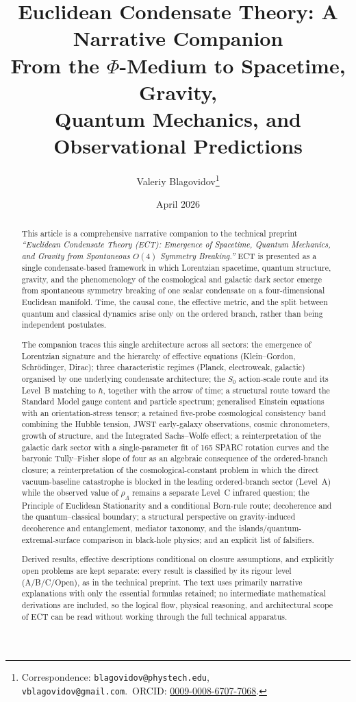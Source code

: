 \documentclass[11pt,a4paper]{article}
\title{\textbf{Euclidean Condensate Theory: A Narrative Companion}\\[6pt]
\large From the $\Phi$-Medium to Spacetime, Gravity,\\
Quantum Mechanics, and Observational Predictions}
\author{Valeriy Blagovidov\thanks{Correspondence: \texttt{blagovidov@phystech.edu}, \texttt{vblagovidov@gmail.com}.~ORCID: \href{https://orcid.org/0009-0008-6707-7068}{0009-0008-6707-7068}.}}
\date{April 2026}
\begin{document}
\maketitle

\begin{abstract}
This article is a comprehensive narrative companion to the technical preprint \emph{``Euclidean Condensate Theory (ECT): Emergence of Spacetime, Quantum Mechanics, and Gravity from Spontaneous $O(4)$ Symmetry Breaking.''} ECT is presented as a single condensate-based framework in which Lorentzian spacetime, quantum structure, gravity, and the phenomenology of the cosmological and galactic dark sector emerge from spontaneous symmetry breaking of one scalar condensate on a four-dimensional Euclidean manifold. Time, the causal cone, the effective metric, and the split between quantum and classical dynamics arise only on the ordered branch, rather than being independent postulates.

The companion traces this single architecture across all sectors: the emergence of Lorentzian signature and the hierarchy of effective equations (Klein--Gordon, Schr\"odinger, Dirac); three characteristic regimes (Planck, electroweak, galactic) organised by one underlying condensate architecture; the $S_0$ action-scale route and its Level~B matching to $\hbar$, together with the arrow of time; a structural route toward the Standard Model gauge content and particle spectrum; generalised Einstein equations with an orientation-stress tensor; a retained five-probe cosmological consistency band combining the Hubble tension, JWST early-galaxy observations, cosmic chronometers, growth of structure, and the Integrated Sachs--Wolfe effect; a reinterpretation of the galactic dark sector with a single-parameter fit of 165 SPARC rotation curves and the baryonic Tully--Fisher slope of four as an algebraic consequence of the ordered-branch closure; a reinterpretation of the cosmological-constant problem in which the direct vacuum-baseline catastrophe is blocked in the leading ordered-branch sector (Level~A) while the observed value of $\rho_\Lambda$ remains a separate Level~C infrared question; the Principle of Euclidean Stationarity and a conditional Born-rule route; decoherence and the quantum--classical boundary; a structural perspective on gravity-induced decoherence and entanglement, mediator taxonomy, and the islands/quantum-extremal-surface comparison in black-hole physics; and an explicit list of falsifiers.

Derived results, effective descriptions conditional on closure assumptions, and explicitly open problems are kept separate: every result is classified by its rigour level (A/B/C/Open), as in the technical preprint. The text uses primarily narrative explanations with only the essential formulas retained; no intermediate mathematical derivations are included, so the logical flow, physical reasoning, and architectural scope of ECT can be read without working through the full technical apparatus.
\end{abstract}
\end{document}
